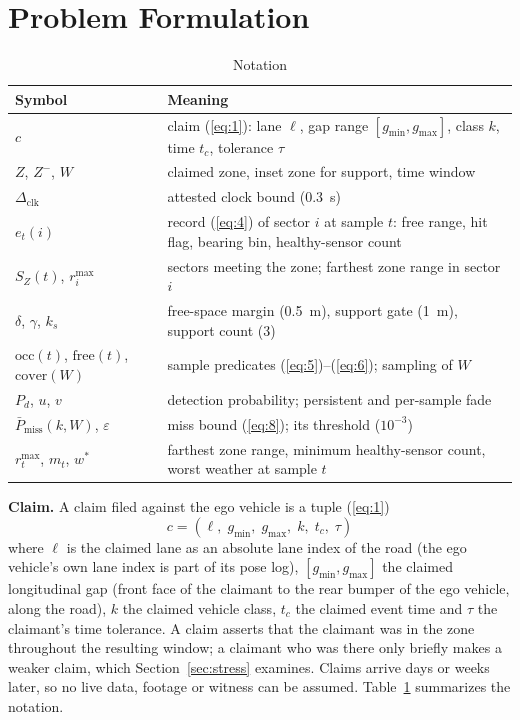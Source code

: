 \section{Problem Formulation}\label{sec:problem}

\begin{table}[!t]
\centering
\footnotesize
\caption{Notation}
\label{tab:notation}
\renewcommand{\arraystretch}{1.1}
\begin{tabular}{>{\raggedright\arraybackslash}p{2.4cm}>{\raggedright\arraybackslash}p{5.5cm}}
\toprule
\textbf{Symbol} & \textbf{Meaning} \\
\midrule
$c$ & claim (\ref{eq:1}): lane $\ell$, gap range $[g_{\min}, g_{\max}]$, class $k$, time $t_c$, tolerance $\tau$ \\
$Z$, $Z^-$, $W$ & claimed zone, inset zone for support, time window \\
$\Delta_{\mathrm{clk}}$ & attested clock bound (0.3~s) \\
$e_t(i)$ & record (\ref{eq:4}) of sector $i$ at sample $t$: free range, hit flag, bearing bin, healthy-sensor count \\
$S_Z(t)$, $r_i^{\max}$ & sectors meeting the zone; farthest zone range in sector $i$ \\
$\delta$, $\gamma$, $k_s$ & free-space margin (0.5~m), support gate (1~m), support count (3) \\
$\mathrm{occ}(t)$, $\mathrm{free}(t)$, $\mathrm{cover}(W)$ & sample predicates (\ref{eq:5})--(\ref{eq:6}); sampling of $W$ \\
$P_d$, $u$, $v$ & detection probability; persistent and per-sample fade \\
$\bar P_{\mathrm{miss}}(k, W)$, $\varepsilon$ & miss bound (\ref{eq:8}); its threshold ($10^{-3}$) \\
$r_t^{\max}$, $m_t$, $w^*$ & farthest zone range, minimum healthy-sensor count, worst weather at sample $t$ \\
\bottomrule
\end{tabular}
\end{table}

\textbf{Claim.} A claim filed against the ego vehicle is a tuple (\ref{eq:1})
\begin{equation}
c = (\ell,\; g_{\min},\; g_{\max},\; k,\; t_c,\; \tau)
\label{eq:1}
\end{equation}
where $\ell$ is the claimed lane as an absolute lane index of the road (the ego vehicle's own lane index is part of its pose log), $[g_{\min}, g_{\max}]$ the claimed longitudinal gap (front face of the claimant to the rear bumper of the ego vehicle, along the road), $k$ the claimed vehicle class, $t_c$ the claimed event time and $\tau$ the claimant's time tolerance. A claim asserts that the claimant was in the zone throughout the resulting window; a claimant who was there only briefly makes a weaker claim, which Section~\ref{sec:stress} examines. Claims arrive days or weeks later, so no live data, footage or witness can be assumed. Table~\ref{tab:notation} summarizes the notation.


